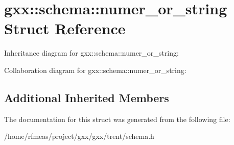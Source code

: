 \hypertarget{structgxx_1_1schema_1_1numer__or__string}{}\section{gxx\+:\+:schema\+:\+:numer\+\_\+or\+\_\+string Struct Reference}
\label{structgxx_1_1schema_1_1numer__or__string}


Inheritance diagram for gxx\+:\+:schema\+:\+:numer\+\_\+or\+\_\+string\+:


Collaboration diagram for gxx\+:\+:schema\+:\+:numer\+\_\+or\+\_\+string\+:
\subsection*{Additional Inherited Members}


The documentation for this struct was generated from the following file\+:\begin{DoxyCompactItemize}
\item 
/home/rfmeas/project/gxx/gxx/trent/schema.\+h\end{DoxyCompactItemize}

